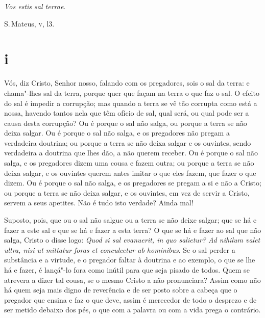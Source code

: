 \epigraph{\emph{Vos estis sal terrae}.}{S.\,Mateus, \textsc{v}, l3.}

\section{i}

\noindent{}Vós, diz Cristo, Senhor nosso, falando com os pregadores, sois o sal da
terra: e chama"-lhes sal da terra, porque quer que façam na terra o que
faz o sal. O efeito do sal é impedir a corrupção; mas quando a terra se
vê tão corrupta como está a nossa, havendo tantos nela que têm ofício de
sal, qual será, ou qual pode ser a causa desta corrupção? Ou é porque o
sal não salga, ou porque a terra se não deixa salgar. Ou é porque o sal
não salga, e os pregadores não pregam a verdadeira doutrina; ou porque a
terra se não deixa salgar e os ouvintes, sendo verdadeira a doutrina que
lhes dão, a não querem receber. Ou é porque o sal não salga, e os
pregadores dizem uma cousa e fazem outra; ou porque a terra se não deixa
salgar, e os ouvintes querem antes imitar o que eles fazem, que fazer o
que dizem. Ou é porque o sal não salga, e os pregadores se pregam a si e
não a Cristo; ou porque a terra se não deixa salgar, e os ouvintes, em
vez de servir a Cristo, servem a seus apetites. Não é tudo isto verdade?
Ainda mal!

Suposto, pois, que ou o sal não salgue ou a terra se não deixe salgar;
que se há e fazer a este sal e que se há e fazer a esta terra? O que se
há e fazer ao sal que não salga, Cristo o disse logo: \emph{Quod si sal
evanuerit, in quo salietur? Ad nihilum valet ultra, nisi ut mittatur
foras et conculcetur ab hominibus}. Se o sal perder a substância e a
virtude, e o pregador faltar à doutrina e ao exemplo, o que se lhe há e
fazer, é lançá"-lo fora como inútil para que seja pisado de todos. Quem
se atrevera a dizer tal cousa, se o mesmo Cristo a não pronunciara?
Assim como não há quem seja mais digno de reverência e de ser posto
sobre a cabeça que o pregador que ensina e faz o que deve, assim é
merecedor de todo o desprezo e de ser metido debaixo dos pés, o que com
a palavra ou com a vida prega o contrário.

